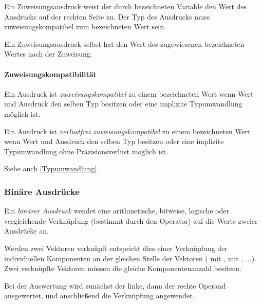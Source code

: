 Ein Zuweisungsausdruck  weist der durch \glq{}\grq bezeichneten Variable den Wert des Ausdrucks
auf der rechten Seite zu. Der Typ des Ausdrucks muss zuweisungskompatibel zum bezeichneten Wert
sein.

Ein Zuweisungsausdruck selbst hat den Wert des zugewiesenen bezeichneten Wertes nach der Zuweisung.

\paragraph{Zuweisungskompatibilität}\label{Zuweisungskompatibilitaet}

Ein Ausdruck ist \emph{zuweisungskompatibel} zu einem bezeichneten Wert wenn
Wert und Ausdruck den selben Typ besitzen oder eine implizite Typumwandlung
möglich ist.

Ein Ausdruck ist \emph{verlustfrei zuweisungskompatibel} zu einem bezeichneten Wert
wenn Wert und Ausdruck den selben Typ besitzen oder eine implizite Typumwandlung
ohne Präzisionsverlust möglich ist.

Siehe auch \ref{Typumwandlung}.


\subsubsection{Binäre Ausdrücke}\label{Binaere Ausdruecke}

Ein \emph{binärer Ausdruck} wendet eine arithmetische, bitweise, logische oder vergleichende Verknüpfung
(bestimmt durch den Operator) auf die Werte zweier Ausdrücke an.

Werden zwei Vektoren verknüpft entspricht dies einer Verknüpfung der individuellen Komponenten an der gleichen
Stelle der Vektoren ( mit ,  mit , $\dots$). Zwei verknüpfte Vektoren müssen
die gleiche Komponentenanzahl besitzen.

Bei der Auswertung wird zunächst der linke, dann der rechte Operand ausgewertet, und an\-schließend die Verknüpfung angewendet.

